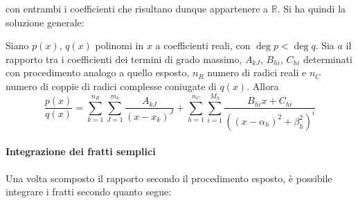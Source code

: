 \documentclass[10pt]{article}
\theoremstyle{plain}
\begin{document}
con entrambi i coefficienti che risultano dunque appartenere a $\mathbb{R}$.
Si ha quindi la soluzione generale:
\begin{ther}
    Siano $p(x)$, $q(x)$ polinomi in $x$ a coefficienti reali, con $\deg p < \deg q$. Sia $a$ il rapporto tra i coefficienti dei termini di grado massimo, $A_{kJ}$, $B_{hi}$, $C_{hi}$ determinati con procedimento analogo a quello esposto, $n_R$ numero di radici reali  e $n_C$ numero di coppie di radici complesse coniugate di $q(x)$. Allora
    \[\frac{p(x)}{q(x)} = \sum \limits_{k = 1}^{n_R} \sum \limits_{J = 1}^{m_k}\frac{A_{kJ}}{(x-x_k)^J} + \sum \limits_{h = 1}^{n_C} \sum \limits_{i = 1}^{M_h}\frac{B_{hi} x + C_{hi}}{((x - \alpha_h)^2 + \beta_h^2 )^i}\]
\end{ther}

\paragraph*{Integrazione dei fratti semplici}
Una volta scomposto il rapporto secondo il procedimento esposto, è possibile integrare i fratti secondo quanto segue:
\end{document}
